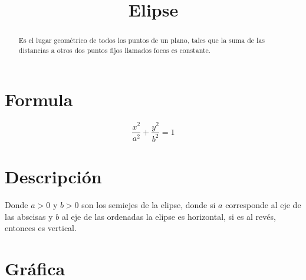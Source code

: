 
\title{Elipse}


\maketitle
\begin{abstract}
    \centering
    Es el lugar geométrico de todos los puntos de un plano, tales que la suma de las distancias a otros dos puntos fijos llamados focos es constante.
\end{abstract}
\section{Formula}
\begin{equation}
    \dfrac{x^2}{a^2} + \dfrac{y^2}{b^2} = 1
\end{equation}
\section{Descripción}
Donde $a > 0$ y $b > 0$ son los semiejes de la elipse, donde si $a$ corresponde al eje de las abscisas y $b$ al eje de las ordenadas la elipse es horizontal, si es al revés, entonces es vertical.
\section{Gráfica}
